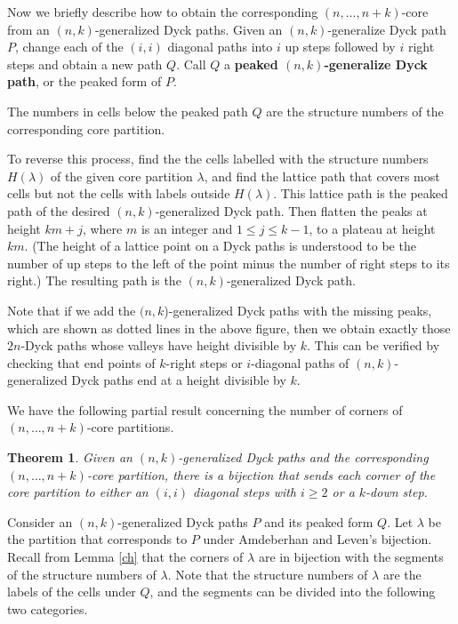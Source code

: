 \documentclass[a4paper,12pt]{article}
\def\proof{\noindent {\it{Proof.} \hskip 2pt}}
\def \remark {\noindent \emph{Remark. }}
\newtheorem{thm}{Theorem}[section]
\begin{document}
Now we briefly describe how to obtain the corresponding $(n,\ldots,n+k)$-core from an $(n,k)$-generalized Dyck paths.
Given an $(n,k)$-generalize Dyck path $P$, change each of the $(i,i)$ diagonal paths into $i$ up steps followed by $i$ right steps and obtain a new path $Q$. Call $Q$ a \textbf{peaked $(n,k)$-generalize Dyck path}, or the peaked form of $P$.


The numbers in cells below the peaked path $Q$ are the structure numbers of the corresponding core partition.

To reverse this process, find the the cells labelled with the structure numbers $H(\lambda)$ of the given core partition $\lambda$, and find the lattice path that covers most cells but not the cells with labels outside $H(\lambda)$. This lattice path is the peaked path of the desired $(n,k)$-generalized Dyck path. Then flatten the peaks at height $km+j$, where $m$ is an integer and $1\leq j \leq k-1$, to a plateau at height $km$. (The height of a lattice point on a Dyck paths is understood to  be the number of up steps to the left of the point minus the number of right steps to its right.) The resulting path is the $(n,k)$-generalized Dyck path.

Note that  if we add the  $(n,k$)-generalized  Dyck paths with the missing peaks, which are shown as dotted lines in the above figure, then we obtain exactly those $2n$-Dyck paths whose valleys have height divisible by $k$. This can be  verified by checking that end points of $k$-right steps or $i$-diagonal paths of $(n,k)$-generalized Dyck paths end at a height divisible by $k$.



We have the following partial result concerning the number of corners of $(n,\ldots,n+k)$-core partitions.

\begin{thm}
Given an $(n,k)$-generalized Dyck paths and the corresponding $(n,\ldots,n+k)$-core partition, there is a bijection that sends each corner of the core partition to either an $(i,i)$ diagonal steps with $i\geq 2$ or a $k$-down step.
\end{thm}

\proof Consider an $(n,k)$-generalized Dyck paths $P$ and its peaked form $Q$.
Let $\lambda$ be the partition that corresponds to $P$ under  Amdeberhan and Leven's bijection. Recall from  Lemma \ref{ch} that the corners of $\lambda$ are in bijection with the segments of the structure numbers of $\lambda$. Note that the structure numbers of $\lambda$ are the labels of the cells under $Q$, and the segments can be divided into the following two categories.
\end{document}
